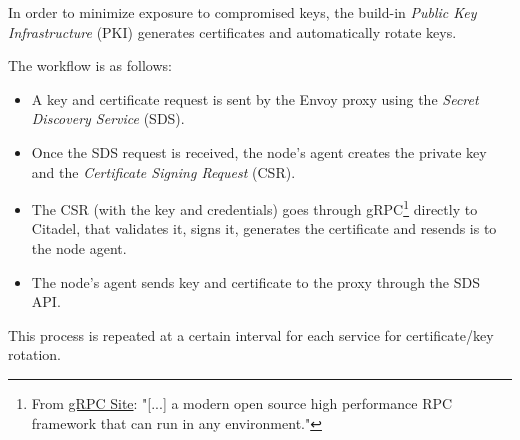 In order to minimize exposure to compromised keys, the build-in \textit{Public Key Infrastructure} (PKI) generates certificates and automatically rotate keys.

\noindent The workflow is as follows:

\begin{itemize}
    \item[1.] A key and certificate request is sent by the Envoy proxy using the \textit{Secret Discovery Service} (SDS).
    \item[2.] Once the SDS request is received, the node's agent creates the private key and the \textit{Certificate Signing Request} (CSR).
    \item[3.] The CSR (with the key and credentials) goes through gRPC\footnote{From \href{https://grpc.io/}{gRPC Site}: "[...] a modern open source high performance RPC framework that can run in any environment."} directly to Citadel, that validates it, signs it, generates the certificate and resends is to the node agent.
    \item[4.] The node's agent sends key and certificate to the proxy through the SDS API. 
\end{itemize}

\noindent This process is repeated at a certain interval for each service for certificate/key rotation.



